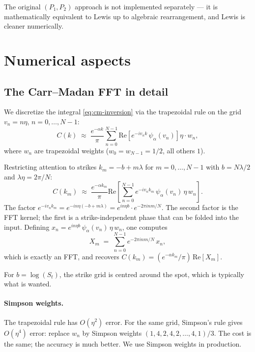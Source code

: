 \documentclass[11pt]{article}
\theoremstyle{plain}
\theoremstyle{definition}
\theoremstyle{remark}
\begin{document}
The original \((P_1, P_2)\) approach is not implemented separately --- it is mathematically equivalent to Lewis up to algebraic rearrangement, and Lewis is cleaner numerically.

\section{Numerical aspects}

\subsection{The Carr--Madan FFT in detail}

We discretize the integral \eqref{eq:cm-inversion} via the trapezoidal rule on the grid \(v_n = n \eta\), \(n = 0, \ldots, N-1\):
\[
    C(k) \;\approx\; \frac{e^{-\alpha k}}{\pi} \sum_{n=0}^{N-1} \mathrm{Re}\!\left[ e^{-i v_n k}\, \psi_\alpha(v_n) \right] \eta \cdot w_n,
\]
where \(w_n\) are trapezoidal weights (\(w_0 = w_{N-1} = 1/2\), all others \(1\)).

Restricting attention to strikes \(k_m = -b + m \lambda\) for \(m = 0, \ldots, N-1\) with \(b = N\lambda/2\) and \(\lambda \eta = 2\pi/N\):
\[
    C(k_m) \;\approx\; \frac{e^{-\alpha k_m}}{\pi} \mathrm{Re}\!\left[ \sum_{n=0}^{N-1} e^{-i v_n k_m}\, \psi_\alpha(v_n)\, \eta\, w_n \right].
\]
The factor \(e^{-i v_n k_m} = e^{-i n \eta (-b + m\lambda)} = e^{i n \eta b} \cdot e^{-2\pi i n m / N}\). The second factor is the FFT kernel; the first is a strike-independent phase that can be folded into the input. Defining \(x_n = e^{i n \eta b}\, \psi_\alpha(v_n)\, \eta\, w_n\), one computes
\[
    X_m \;=\; \sum_{n=0}^{N-1} e^{-2\pi i n m / N}\, x_n,
\]
which is exactly an FFT, and recovers \(C(k_m) = (e^{-\alpha k_m}/\pi)\, \mathrm{Re}[X_m]\).

For \(b = \log(S_t)\), the strike grid is centred around the spot, which is typically what is wanted.

\paragraph{Simpson weights.} The trapezoidal rule has \(O(\eta^2)\) error. For the same grid, Simpson's rule gives \(O(\eta^4)\) error: replace \(w_n\) by Simpson weights \((1, 4, 2, 4, 2, \ldots, 4, 1)/3\). The cost is the same; the accuracy is much better. We use Simpson weights in production.
\end{document}
